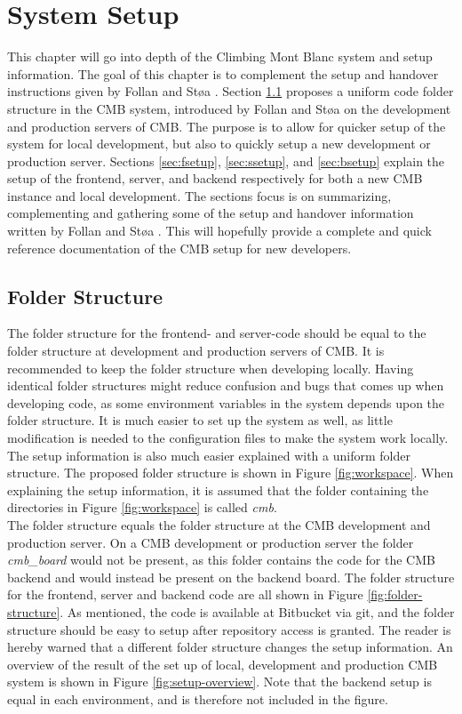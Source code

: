 \chapter{System Setup}
\label{apdx:setup}
This chapter will go into depth of the Climbing Mont Blanc system and setup information. The goal of this chapter is to complement the setup and handover instructions given by Follan and Støa \cite{mt:T&S}. Section \ref{sec:folder} proposes a uniform code folder structure in the CMB system, introduced by Follan and Støa on the development and production servers of CMB. The purpose is to allow for quicker setup of the system for local development, but also to quickly setup a new development or production server. Sections \ref{sec:fsetup}, \ref{sec:ssetup}, and \ref{sec:bsetup} explain the setup of the frontend, server, and backend respectively for both a new CMB instance and local development. The sections focus is on summarizing, complementing and gathering some of the setup and handover information written by Follan and Støa \cite{mt:T&S}. This will hopefully provide a complete and quick reference documentation of the CMB setup for new developers.

\section{Folder Structure}
\label{sec:folder}
The folder structure for the frontend- and server-code should be equal to the folder structure at development and production servers of CMB. It is recommended to keep the folder structure when developing locally. Having identical folder structures might reduce confusion and bugs that comes up when developing code, as some environment variables in the system depends upon the folder structure. It is much easier to set up the system as well, as little modification is needed to the configuration files to make the system work locally. The setup information is also much easier explained with a uniform folder structure. The proposed folder structure is shown in Figure \ref{fig:workspace}. When explaining the setup information, it is assumed that the folder containing the directories in Figure \ref{fig:workspace} is called \textit{cmb}. \\

The folder structure equals the folder structure at the CMB development and production server. On a CMB development or production server the folder \textit{cmb\_board} would not be present, as this folder contains the code for the CMB backend and would instead be present on the backend board. The folder structure for the frontend, server and backend code are all shown in Figure \ref{fig:folder-structure}. As mentioned, the code is available at Bitbucket via git, and the folder structure should be easy to setup after repository access is granted. The reader is hereby warned that a different folder structure changes the setup information. An overview of the result of the set up of local, development and production CMB system is shown in Figure \ref{fig:setup-overview}. Note that the backend setup is equal in each environment, and is therefore not included in the figure.

